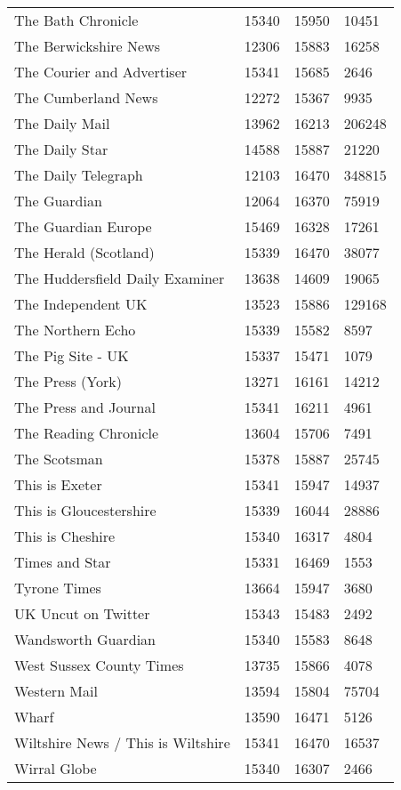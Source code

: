 \begin{longtable}{p{}p{}p{}p{}}
  The Bath Chronicle & 15340 & 15950 & 10451 \\ 
  The Berwickshire News & 12306 & 15883 & 16258 \\ 
  The Courier and Advertiser & 15341 & 15685 & 2646 \\ 
  The Cumberland News & 12272 & 15367 & 9935 \\ 
  The Daily Mail & 13962 & 16213 & 206248 \\ 
  The Daily Star & 14588 & 15887 & 21220 \\ 
  The Daily Telegraph & 12103 & 16470 & 348815 \\ 
  The Guardian & 12064 & 16370 & 75919 \\ 
  The Guardian Europe & 15469 & 16328 & 17261 \\ 
  The Herald (Scotland) & 15339 & 16470 & 38077 \\ 
  The Huddersfield Daily Examiner & 13638 & 14609 & 19065 \\ 
  The Independent UK & 13523 & 15886 & 129168 \\ 
  The Northern Echo & 15339 & 15582 & 8597 \\ 
  The Pig Site - UK & 15337 & 15471 & 1079 \\ 
  The Press (York) & 13271 & 16161 & 14212 \\ 
  The Press and Journal & 15341 & 16211 & 4961 \\ 
  The Reading Chronicle & 13604 & 15706 & 7491 \\ 
  The Scotsman & 15378 & 15887 & 25745 \\ 
  This is Exeter & 15341 & 15947 & 14937 \\ 
  This is Gloucestershire & 15339 & 16044 & 28886 \\ 
  This is Cheshire & 15340 & 16317 & 4804 \\ 
  Times and Star & 15331 & 16469 & 1553 \\ 
  Tyrone Times & 13664 & 15947 & 3680 \\ 
  UK Uncut on Twitter & 15343 & 15483 & 2492 \\ 
  Wandsworth Guardian & 15340 & 15583 & 8648 \\ 
  West Sussex County Times & 13735 & 15866 & 4078 \\ 
  Western Mail & 13594 & 15804 & 75704 \\ 
  Wharf & 13590 & 16471 & 5126 \\ 
  Wiltshire News / This is Wiltshire & 15341 & 16470 & 16537 \\ 
  Wirral Globe & 15340 & 16307 & 2466 \\ 

\end{longtable}
